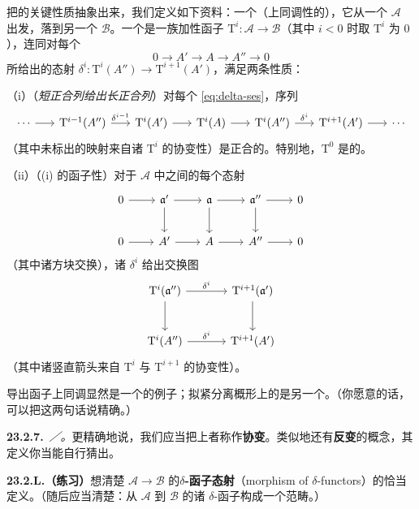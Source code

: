 把\trDerivedFunctor{}的关键性质抽象出来，我们定义如下资料：一个（上同调性的）\trDeltaFunctor，它从一个\trAbelianCategory{} $\mathscr{A}$ 出发，落到另一个\trAbelianCategory{} $\mathscr{B}$。一个\textbf{\trDeltaFunctor}是一族加性函子 $\mathrm{T}^i\colon\mathscr{A}\to\mathscr{B}$（其中 $i<0$ 时取 $\mathrm{T}^i$ 为 $0$），连同对每个\trShortExactSequence
\[
\tag{23.2.6.1}\label{eq:delta-ses}
0 \longrightarrow A' \longrightarrow A \longrightarrow A'' \longrightarrow 0
\]
所给出的态射 $\delta^i\colon\mathrm{T}^i(A'')\to\mathrm{T}^{i+1}(A')$，满足两条性质：

（i）（\emph{短正合列给出长正合列}）对每个\trShortExactSequence{} \eqref{eq:delta-ses}，序列
\[
\begin{tikzcd}[column sep=1.7em]
\cdots \ar[r] & \mathrm{T}^{i-1}(A'') \ar[r, "\delta^{i-1}"] & \mathrm{T}^i(A') \ar[r] & \mathrm{T}^i(A) \ar[r] & \mathrm{T}^i(A'') \ar[r, "\delta^i"] & \mathrm{T}^{i+1}(A') \ar[r] & \cdots
\end{tikzcd}
\]
（其中未标出的映射来自诸 $\mathrm{T}^i$ 的协变性）是正合的。特别地，$\mathrm{T}^0$ 是\trLeftExact{}的。

（ii）（(i) 的函子性）对于 $\mathscr{A}$ 中\trShortExactSequence{}之间的每个态射
\[
\begin{tikzcd}[row sep=2.2em, column sep=2.2em]
0 \ar[r] & \mathfrak{a}' \ar[r] \ar[d] & \mathfrak{a} \ar[r] \ar[d] & \mathfrak{a}'' \ar[r] \ar[d] & 0 \\
0 \ar[r] & A' \ar[r] & A \ar[r] & A'' \ar[r] & 0
\end{tikzcd}
\]
（其中诸方块交换），诸 $\delta^i$ 给出交换图
\[
\begin{tikzcd}[row sep=2.6em, column sep=3.4em]
\mathrm{T}^i(\mathfrak{a}'') \ar[r, "\delta^i"] \ar[d] & \mathrm{T}^{i+1}(\mathfrak{a}') \ar[d] \\
\mathrm{T}^i(A'') \ar[r, "\delta^i"] & \mathrm{T}^{i+1}(A')
\end{tikzcd}
\]
（其中诸竖直箭头来自 $\mathrm{T}^i$ 与 $\mathrm{T}^{i+1}$ 的协变性）。

导出函子上同调显然是一个\trDeltaFunctor{}的例子；拟紧分离概形上\trSheaf{}的\trCechCohomology{}是另一个。（你愿意的话，可以把这两句话说精确。）

\textbf{23.2.7.}\ \emph{\trhRemark／\trhDefinition。}\quad 更精确地说，我们应当把上者称作\textbf{协变\trDeltaFunctor}。类似地还有\textbf{反变\trDeltaFunctor}的概念，其定义你当能自行猜出。

\textbf{23.2.L.（练习）}\quad 想清楚 $\mathscr{A}\to\mathscr{B}$ 的\textbf{$\delta$-函子态射}（morphism of $\delta$-functors）的恰当定义。（随后应当清楚：从 $\mathscr{A}$ 到 $\mathscr{B}$ 的诸 $\delta$-函子构成一个范畴。）

